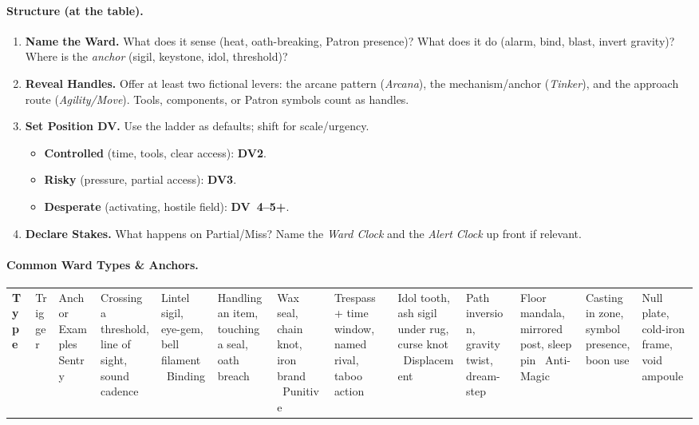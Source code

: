 \paragraph{Structure (at the table).}
\begin{enumerate}[label=\textbf{Step~\arabic*:}, leftmargin=2.1em]
\item \textbf{Name the Ward.} What does it sense (heat, oath-breaking, Patron presence)? What does it do (alarm, bind, blast, invert gravity)? Where is the \emph{anchor} (sigil, keystone, idol, threshold)?
\item \textbf{Reveal Handles.} Offer at least two fictional levers: the arcane pattern (\emph{Arcana}), the mechanism/anchor (\emph{Tinker}), and the approach route (\emph{Agility/Move}). Tools, components, or Patron symbols count as handles.
\item \textbf{Set Position \textrightarrow{} DV.} Use the ladder as defaults; shift for scale/urgency.
\begin{itemize}
\item \textbf{Controlled} (time, tools, clear access): \textbf{DV2}.
\item \textbf{Risky} (pressure, partial access): \textbf{DV3}.
\item \textbf{Desperate} (activating, hostile field): \textbf{DV~4–5+}.
\end{itemize}
\item \textbf{Declare Stakes.} What happens on Partial/Miss? Name the \emph{Ward Clock} and the \emph{Alert Clock} up front if relevant.
\end{enumerate}

\paragraph{Common Ward Types & Anchors.}
\begin{tabularx}{\linewidth}{>{\bfseries}l >{\raggedright}X >{\raggedright}X}
\toprule
Type & Trigger & Anchor Examples \
\midrule
Sentry & Crossing a threshold, line of sight, sound cadence & Lintel sigil, eye-gem, bell filament \
Binding & Handling an item, touching a seal, oath breach & Wax seal, chain knot, iron brand \
Punitive & Trespass + time window, named rival, taboo action & Idol tooth, ash sigil under rug, curse knot \
Displacement & Path inversion, gravity twist, dream-step & Floor mandala, mirrored post, sleep pin \
Anti-Magic & Casting in zone, symbol presence, boon use & Null plate, cold-iron frame, void ampoule \
\bottomrule
\end{tabularx}

